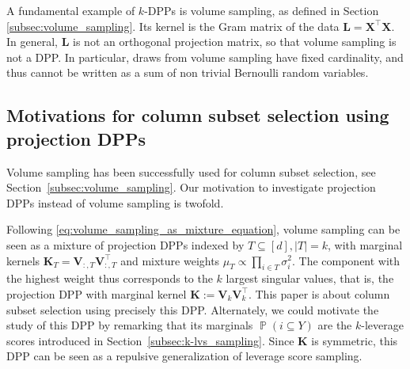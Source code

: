 \documentclass[twoside,11pt]{book}
\DeclareMathOperator{\Det}{Det}
\DeclareMathOperator{\Tran}{\intercal}
\DeclareMathOperator{\Prb}{\mathbb{P}}
\begin{document}

A fundamental example of $k$-DPPs is volume sampling, as defined in Section \ref{subsec:volume_sampling}. Its kernel is the Gram matrix of the data $\bm{L} = \bm{X}^{\Tran}\bm{X}$. In general, $\bm{L}$ is not an orthogonal projection matrix, so that volume sampling is not a DPP. In particular, draws from volume sampling have fixed cardinality, and thus cannot be written as a sum of non trivial Bernoulli random variables.

\subsection{Motivations for column subset selection using projection DPPs}
Volume sampling has been successfully used for column subset selection, see Section~\ref{subsec:volume_sampling}. Our motivation to investigate projection DPPs instead of volume sampling is twofold.

Following \eqref{eq:volume_sampling_as_mixture_equation}, volume sampling can be seen as a mixture of projection DPPs indexed by $T\subseteq [d], \vert T\vert=k$, with marginal kernels $\bm{K}_{T} = \bm{V}^{}_{:,T}\bm{V}^{\Tran}_{:,T}$ and mixture weights $\mu_{T} \propto \prod_{i \in T} \sigma_{i}^{2}$. The component with the highest weight thus corresponds to the $k$ largest singular values, that is, the projection DPP with marginal kernel
$\bm K:=\bm{V}^{}_{k}\bm{V}_{k}^{\Tran}$. This paper is about column subset selection using precisely this DPP. Alternately, we could motivate the study of this DPP by remarking that its marginals $\Prb({i}\subseteq Y)$ are the $k$-leverage scores introduced in Section~\ref{subsec:k-lvs_sampling}. Since $\bm K$ is symmetric, this DPP can be seen as a repulsive generalization of leverage score sampling.
\end{document}
